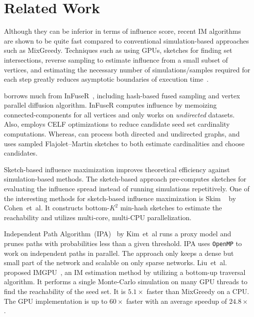\documentclass[10pt,journal,compsoc]{IEEEtran}
\newcommand\acro{{\sc{HyperFuseR\xspace}\xspace}\xspace}
\begin{document}
\section{Related Work}\label{sec:relatedwork}

Although they can be inferior in terms of influence score, recent IM algorithms are shown to be quite fast compared to conventional simulation-based approaches such as {\sc MixGreedy}. 
Techniques such as using GPUs, sketches for finding set intersections, reverse sampling to estimate influence from a small subset of vertices, and estimating the necessary number of simulations/samples required for each step greatly reduces asymptotic boundaries of execution time~\cite{leskovec2009community, borgs2014maximizing, minutoli2019fast, cohen2014sketch, IPA, IMGPU, curipples}. 

\acro borrows much from {\sc InFuseR}~\cite{infuser}, including hash-based fused sampling and vertex parallel diffusion algorithm. {\sc InFuseR} computes influence by memoizing connected-components for all vertices and only works on {\em undirected} datasets. Also, employs CELF optimizations to reduce candidate seed set cardinality computations. Whereas, \acro can process both directed and undirected graphs, and uses sampled Flajolet–Martin sketches to both estimate cardinalities and choose candidates. 

Sketch-based influence maximization improves theoretical efficiency against simulation-based methods. The sketch-based approach pre-computes sketches for evaluating the influence spread instead of running simulations repetitively. One of the interesting methods for sketch-based influence maximization is {\sc Skim} ~\cite{cohen2014sketch} by Cohen~et~al. It constructs bottom-$K^2$ min-hash sketches to estimate the reachability and utilizes multi-core, multi-CPU parallelization. 

Independent Path Algorithm~(IPA)~\cite{IPA} by Kim~et~al runs a proxy model and prunes paths with probabilities less than a given threshold. IPA uses {\tt OpenMP} to work on independent paths in parallel. The approach only keeps a dense but small part of the network and scalable on only sparse networks. Liu~et~al. proposed IMGPU~\cite{IMGPU}, an IM  estimation method by utilizing a bottom-up traversal algorithm. It performs a single Monte-Carlo simulation on many GPU threads to find the reachability of the seed set. It is $5.1\times$ faster than {\sc MixGreedy} on a CPU. The GPU implementation is up to $60\times$ faster with an average speedup of  $24.8\times$.
\end{document}
